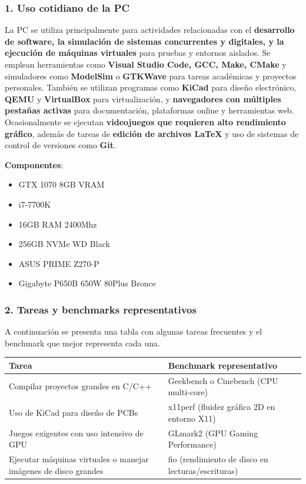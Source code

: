 
\subsubsection*{1. Uso cotidiano de la PC}
La PC se utiliza principalmente para actividades relacionadas con el \textbf{desarrollo de software, la simulación de sistemas concurrentes y digitales, y la ejecución de máquinas virtuales} para pruebas y entornos aislados. Se emplean herramientas como \textbf{Visual Studio Code, GCC, Make, CMake} y simuladores como \textbf{ModelSim} o \textbf{GTKWave} para tareas académicas y proyectos personales. También se utilizan programas como \textbf{KiCad} para diseño electrónico, \textbf{QEMU} y \textbf{VirtualBox} para virtualización, y \textbf{navegadores con múltiples pestañas activas} para documentación, plataformas online y herramientas web. Ocasionalmente se ejecutan \textbf{videojuegos que requieren alto rendimiento gráfico}, además de tareas de \textbf{edición de archivos LaTeX} y uso de sistemas de control de versiones como \textbf{Git}.

\textbf{Componentes}:
\begin{itemize}
    \item GTX 1070 8GB VRAM
    \item i7-7700K
    \item 16GB RAM 2400Mhz
    \item 256GB NVMe WD Black
    \item ASUS PRIME Z270-P
    \item Gigabyte P650B 650W 80Plus Bronce
\end{itemize}

\subsubsection*{2. Tareas y benchmarks representativos}

A continuación se presenta una tabla con algunas tareas frecuentes y el benchmark que mejor representa cada una.

\begin{center}
\begin{tabular}{|p{7cm}|p{7cm}|}
\hline
\textbf{Tarea} & \textbf{Benchmark representativo} \\
\hline
Compilar proyectos grandes en C/C++ & Geekbench o Cinebench (CPU multi-core) \\
\hline
Uso de KiCad para diseño de PCBs & x11perf (fluidez gráfica 2D en entorno X11) \\
\hline
Juegos exigentes con uso intensivo de GPU & GLmark2 (GPU Gaming Performance) \\
\hline
Ejecutar máquinas virtuales o manejar imágenes de disco grandes& fio (rendimiento de disco en lecturas/escrituras) \\
\hline
\end{tabular}
\end{center}

